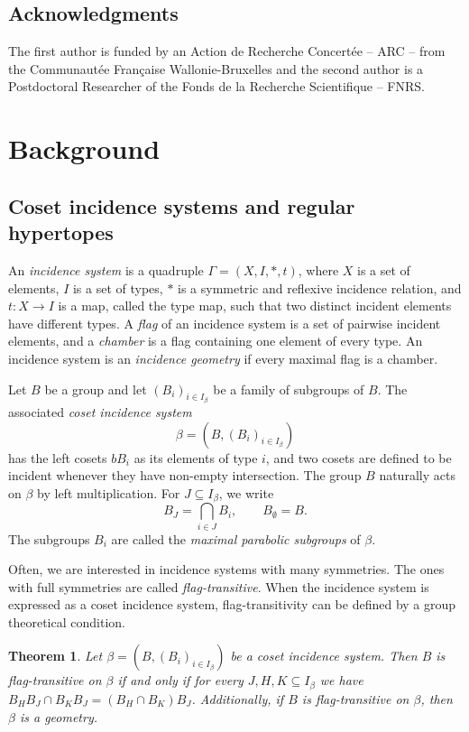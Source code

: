 \documentclass[11pt,letterpaper]{amsart}
\newtheorem{thm}[prop]{Theorem}
\begin{document}
\subsection{Acknowledgments}
The first author is funded by an Action de Recherche Concert\'{e}e -- ARC -- from the Communaut\'{e}e Fran\c{c}aise Wallonie-Bruxelles and the second author is a Postdoctoral Researcher of the Fonds de la Recherche Scientifique -- FNRS.


\section{Background}\label{sec:prelims}

\subsection{Coset incidence systems and regular hypertopes}

An \emph{incidence system} is a quadruple $\Gamma=(X,I,*,t)$, where $X$ is a set of elements, $I$ is a set of types, $*$ is a symmetric and reflexive incidence relation, and $t:X\to I$ is a map, called the type map, such that two distinct incident elements have different types. A \emph{flag} of an incidence system is a set of pairwise incident elements, and a \emph{chamber} is a flag containing one element of every type. An incidence system is an \emph{incidence geometry} if every maximal flag is a chamber.

Let $B$ be a group and let $(B_i)_{i\in I_\beta}$ be a family of subgroups of $B$. The associated \emph{coset incidence system}
\[
\beta=(B,(B_i)_{i\in I_\beta})
\]
has the left cosets $bB_i$ as its elements of type $i$, and two cosets are defined to be incident whenever they have non-empty intersection. The group $B$ naturally acts on $\beta$ by left multiplication. For $J\subseteq I_\beta$, we write
$$B_J=\bigcap_{i\in J}B_i,
\qquad B_\emptyset=B.$$
The subgroups $B_i$ are called the \emph{maximal parabolic subgroups} of $\beta$.

Often, we are interested in incidence systems with many symmetries. The ones with full symmetries are called \textit{flag-transitive}. When the incidence system is expressed as a coset incidence system, flag-transitivity can be defined by a group theoretical condition.

\begin{thm}\cite[Proposition 2.2, adapted]{PiedadeTranchida_FromGroupOps2026}\label{thm:cosetFT}
Let $\beta = (B,(B_i)_{i\in I_\beta})$ be a coset incidence system. Then $B$ is flag-transitive on $\beta$ if and only if for every $J,H,K \subseteq I_\beta$ we have $B_H B_J \cap B_K B_J = (B_H\cap B_K ) B_J$.
Additionally, if $B$ is flag-transitive on $\beta$, then $\beta$ is a geometry.
\end{thm}
\end{document}
